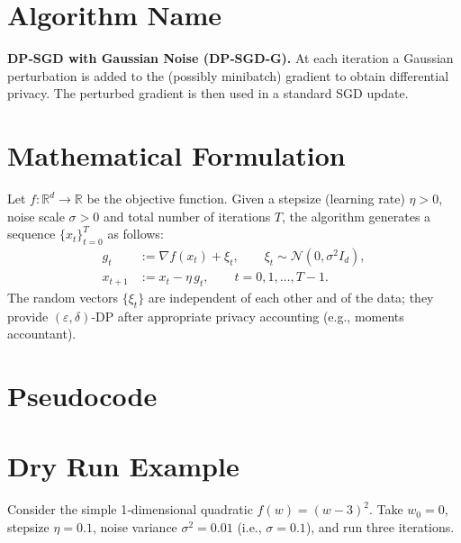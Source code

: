 \documentclass{article}
\begin{document}
\section*{Algorithm Name}
\textbf{DP‑SGD with Gaussian Noise (DP‑SGD‑G).}  
At each iteration a Gaussian perturbation is added to the (possibly minibatch) gradient to obtain differential privacy. The perturbed gradient is then used in a standard SGD update.

\section*{Mathematical Formulation}
Let $f:\mathbb{R}^{d}\rightarrow\mathbb{R}$ be the objective function.  
Given a stepsize (learning rate) $\eta>0$, noise scale $\sigma>0$ and total number of iterations $T$, the algorithm generates a sequence $\{x_t\}_{t=0}^{T}$ as follows:
\[
\boxed{
\begin{aligned}
g_t &:= \nabla f(x_t)+\xi_t, \qquad \xi_t\sim\mathcal N(0,\sigma^{2}I_d),\\[4pt]
x_{t+1} &:= x_t-\eta\, g_t ,\qquad t=0,1,\dots ,T-1 .
\end{aligned}}
\]
The random vectors $\{\xi_t\}$ are independent of each other and of the data; they provide $(\varepsilon,\delta)$‑DP after appropriate privacy accounting (e.g., moments accountant).

\section*{Pseudocode}
\begin{algorithm}[H]
\SetAlgoLined
{}
\caption{DP‑SGD‑G}
\end{algorithm}

\section*{Dry Run Example}
Consider the simple 1‑dimensional quadratic $f(w)=(w-3)^2$.  
Take $w_0=0$, stepsize $\eta=0.1$, noise variance $\sigma^2=0.01$ (i.e., $\sigma=0.1$), and run three iterations.
\end{document}
